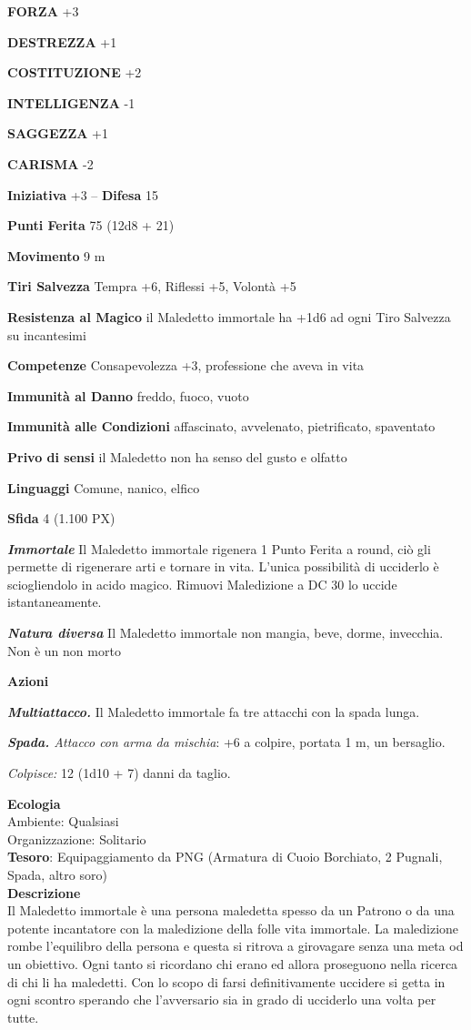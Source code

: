 \begin{multicols}{2}
\textbf{FORZA} +3

\textbf{DESTREZZA} +1

\textbf{COSTITUZIONE} +2

\textbf{INTELLIGENZA} -1

\textbf{SAGGEZZA} +1

\textbf{CARISMA} -2

\textbf{Iniziativa} +3 -- \textbf{Difesa} 15

\textbf{Punti Ferita} 75 (12d8 + 21)

\textbf{Movimento} 9 m

\textbf{Tiri Salvezza} Tempra +6, Riflessi +5, Volontà +5

\textbf{Resistenza al Magico} il Maledetto immortale ha +1d6 ad ogni Tiro Salvezza su incantesimi

\textbf{Competenze} Consapevolezza +3, professione che aveva in vita

\textbf{Immunità al Danno} freddo, fuoco, vuoto

\textbf{Immunità alle Condizioni} affascinato, avvelenato, pietrificato, spaventato

\textbf{Privo di sensi} il Maledetto non ha senso del gusto e olfatto

\textbf{Linguaggi} Comune, nanico, elfico

\textbf{Sfida} 4 (1.100 PX)

\textit{\textbf{Immortale}} Il Maledetto immortale rigenera 1 Punto Ferita a round, ciò gli permette di rigenerare arti e tornare in vita. L'unica possibilità di ucciderlo è sciogliendolo in acido magico. Rimuovi Maledizione a DC 30 lo uccide istantaneamente.

\textit{\textbf{Natura diversa}} Il Maledetto immortale non mangia, beve, dorme, invecchia. Non è un non morto

\textbf{Azioni}

\textit{\textbf{Multiattacco.}} Il Maledetto immortale fa tre attacchi con la spada lunga.

\textit{\textbf{Spada.} Attacco con arma da mischia}: +6 a colpire, portata 1 m, un bersaglio.

\textit{Colpisce:} 12 (1d10 + 7) danni da taglio.

\textbf{Ecologia}\\
Ambiente: Qualsiasi\\
Organizzazione: Solitario\\
\textbf{Tesoro}: Equipaggiamento da PNG (Armatura di Cuoio Borchiato, 2 Pugnali, Spada, altro soro)\\
\textbf{Descrizione}\\
Il Maledetto immortale è una persona maledetta spesso da un Patrono o da una potente incantatore con la maledizione della folle vita immortale. La maledizione rombe l'equilibro della persona e questa si ritrova a girovagare senza una meta od un obiettivo. Ogni tanto si ricordano chi erano ed allora proseguono nella ricerca di chi li ha maledetti.
Con lo scopo di farsi definitivamente uccidere si getta in ogni scontro sperando che l'avversario sia in grado di ucciderlo una volta per tutte.



\end{multicols}
